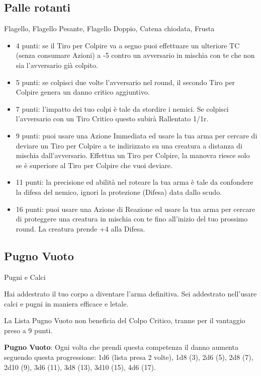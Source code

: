 \begin{multicols}{2}
\subsection{Palle rotanti} Flagello, Flagello Pesante, Flagello Doppio, Catena chiodata, Frusta\label{listaarmipallerotanti}

\begin{itemize}[leftmargin=*] \setlength{\itemsep}{0pt}
\item 4 punti: se il Tiro per Colpire va a segno puoi effettuare un ulteriore TC (senza consumare Azioni) a -5 contro un avversario in mischia con te che non sia l'avversario già colpito.
\item 5 punti: se colpisci due volte l'avversario nel round, il secondo Tiro per Colpire genera un danno critico aggiuntivo.
\item 7 punti: l'impatto dei tuo colpi è tale da stordire i nemici. Se colpisci l'avversario con un Tiro Critico questo subirà Rallentato 1/1r.
\item 9 punti: puoi usare una Azione Immediata ed usare la tua arma per cercare di deviare un Tiro per Colpire a te indirizzato su una creatura a distanza di mischia dall'avversario. Effettua un Tiro per Colpire, la manovra riesce solo se è superiore al Tiro per Colpire che vuoi deviare.
\item 11 punti: la precisione ed abilità nel roteare la tua arma è tale da confondere la difesa del nemico, ignori la protezione (Difesa) data dallo scudo.
\item 16 punti: puoi usare una Azione di Reazione ed usare la tua arma per cercare di proteggere una creatura in mischia con te fino all'inizio del tuo prossimo round. La creatura prende +4 alla Difesa.
\end{itemize}

\subsection{Pugno Vuoto} Pugni e Calci\hypertarget{pugnovuoto}{}\label{listarmipugnonudo}

Hai addestrato il tuo corpo a diventare l'arma definitiva. Sei addestrato nell'usare calci e pugni in maniera efficace e letale.

La Lista Pugno Vuoto non beneficia del Colpo Critico, tranne per il vantaggio preso a 9 punti.

\textbf{Pugno Vuoto}: Ogni volta che prendi questa competenza il danno aumenta seguendo questa progressione: 1d6 (lista presa 2 volte), 1d8 (3), 2d6 (5), 2d8 (7), 2d10 (9), 3d6 (11), 3d8 (13), 3d10 (15), 4d6 (17).


\end{multicols}
